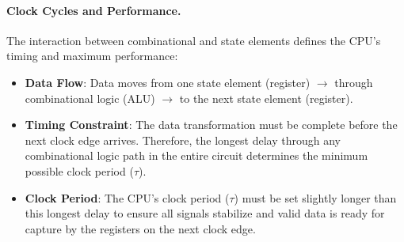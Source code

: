 \paragraph{Clock Cycles and Performance.} The interaction between combinational and state elements defines the CPU's
timing and maximum performance:

\begin{itemize}
    \item \textbf{Data Flow}: Data moves from one state element (register) \(\rightarrow\) through combinational logic (ALU) \(\rightarrow\) to the next state element (register).
    \item \textbf{Timing Constraint}: The data transformation must be complete before the next clock edge arrives. Therefore, the longest delay through any combinational logic path in the entire circuit determines the minimum possible clock period (\(\tau\)).
    \item \textbf{Clock Period}: The CPU's clock period (\(\tau\)) must be set slightly longer than this longest delay to ensure all signals stabilize and valid data is ready for capture by the registers on the next clock edge.
\end{itemize}

